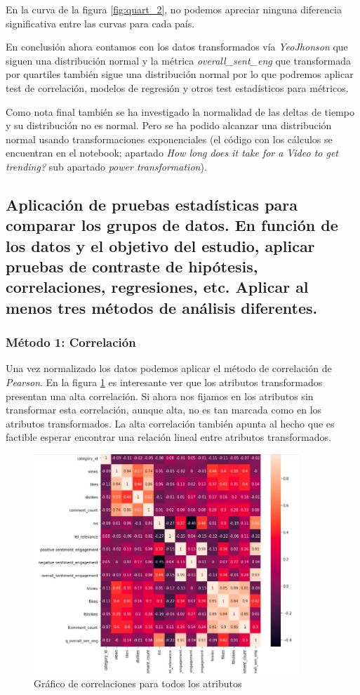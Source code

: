 \documentclass[a4paper,12pt]{article}
\begin{document}
En la curva de la figura \ref{fig:quart_2}, no podemos apreciar ninguna diferencia significativa entre las curvas para cada pa\'is.

En conclusi\'on ahora contamos con los datos transformados  v\'ia {\itshape Yeo\-Jhonson} que siguen una distribuci\'on normal y la m\'etrica {\itshape overall\_sent\_eng} que transformada por quartiles tambi\'en sigue una distribuci\'on normal por lo que podremos aplicar test de correlaci\'on, modelos de regresi\'on y otros test estad\'isticos para m\'etricos.

Como nota final tambi\'en se ha investigado la normalidad de las deltas de tiempo y su distribuci\'on no es normal. Pero se ha podido alcanzar una distribuci\'on normal usando transformaciones exponenciales (el c\'odigo con los c\'alculos se encuentran en el notebook; apartado {\itshape How long does it take for a Video to get trending?} sub apartado {\itshape power transformation}).

\subsection[item_pruebas]{Aplicaci\'on de pruebas estad\'isticas para comparar los grupos de datos. En funci\'on de los datos y el objetivo del estudio, aplicar pruebas de contraste de hip\'otesis, correlaciones, regresiones, etc. Aplicar al menos tres m\'etodos de an\'alisis diferentes.}


\subsubsection{M\'etodo 1: Correlaci\'on}

Una vez normalizado los datos podemos aplicar el m\'etodo de correlaci\'on de {\itshape Pearson}. En la figura \ref{fig:corrplot} es interesante ver que los atributos transformados presentan una alta correlaci\'on. Si ahora nos fijamos en los atributos sin transformar esta correlaci\'on, aunque alta, no es tan marcada como en los atributos transformados.  La alta correlaci\'on tambi\'en apunta al hecho que es factible esperar encontrar una relaci\'on lineal entre atributos transformados.
 
\begin{figure}[h!]
\centering
\includegraphics[width=10cm]{Correlation.JPG}
\caption{Gr\'afico de correlaciones para todos los atributos}
\label{fig:corrplot}
\end{figure}
\end{document}
